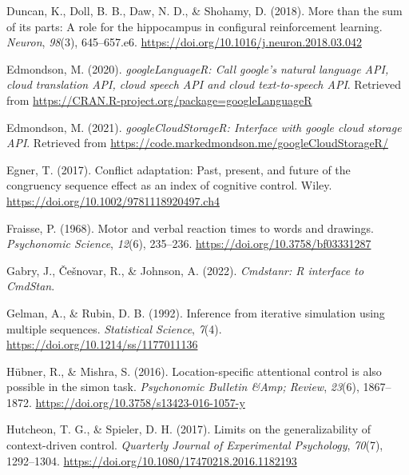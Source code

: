 \documentclass[
  ,man,floatsintext]{apa6}
\newlength{\cslhangindent}
\newlength{\cslentryspacingunit} %
\newenvironment{CSLReferences}[2] %
 {%
  \setlength{\parindent}{0pt}
  \ifodd #1
  \let\oldpar\par
  \def\par{\hangindent=\cslhangindent\oldpar}
  \fi
  \setlength{\parskip}{#2\cslentryspacingunit}
 }%
 {}
\begin{document}
\begin{CSLReferences}{1}{0}
\leavevmode{}%
Duncan, K., Doll, B. B., Daw, N. D., \& Shohamy, D. (2018). More than the sum of its parts: A role for the hippocampus in configural reinforcement learning. \emph{Neuron}, \emph{98}(3), 645--657.e6. \url{https://doi.org/10.1016/j.neuron.2018.03.042}

\leavevmode{}%
Edmondson, M. (2020). \emph{googleLanguageR: Call google's natural language API, cloud translation API, cloud speech API and cloud text-to-speech API}. Retrieved from \url{https://CRAN.R-project.org/package=googleLanguageR}

\leavevmode{}%
Edmondson, M. (2021). \emph{googleCloudStorageR: Interface with google cloud storage API}. Retrieved from \url{https://code.markedmondson.me/googleCloudStorageR/}

\leavevmode{}%
Egner, T. (2017). Conflict adaptation: Past, present, and future of the congruency sequence effect as an index of cognitive control. Wiley. \url{https://doi.org/10.1002/9781118920497.ch4}

\leavevmode{}%
Fraisse, P. (1968). Motor and verbal reaction times to words and drawings. \emph{Psychonomic Science}, \emph{12}(6), 235--236. \url{https://doi.org/10.3758/bf03331287}

\leavevmode{}%
Gabry, J., Češnovar, R., \& Johnson, A. (2022). \emph{Cmdstanr: R interface to CmdStan}.

\leavevmode{}%
Gelman, A., \& Rubin, D. B. (1992). Inference from iterative simulation using multiple sequences. \emph{Statistical Science}, \emph{7}(4). \url{https://doi.org/10.1214/ss/1177011136}

\leavevmode{}%
Hübner, R., \& Mishra, S. (2016). Location-specific attentional control is also possible in the simon task. \emph{Psychonomic Bulletin \&Amp; Review}, \emph{23}(6), 1867--1872. \url{https://doi.org/10.3758/s13423-016-1057-y}

\leavevmode{}%
Hutcheon, T. G., \& Spieler, D. H. (2017). Limits on the generalizability of context-driven control. \emph{Quarterly Journal of Experimental Psychology}, \emph{70}(7), 1292--1304. \url{https://doi.org/10.1080/17470218.2016.1182193}


\end{CSLReferences}
\end{document}
